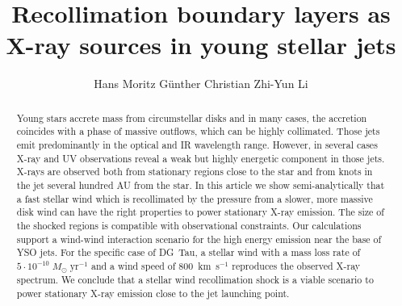 \documentclass[manuscript]{aastex}
\begin{document}

\title{Recollimation boundary layers as X-ray sources in young stellar jets}


\author{Hans Moritz G{\"{u}}nther Christian Zhi-Yun Li}

\begin{abstract}
Young stars accrete mass from circumstellar disks and in many cases, the
accretion coincides with a phase of massive outflows, which can be
highly collimated. Those jets emit predominantly in the optical and IR
wavelength range. However, in several cases X-ray and UV observations
reveal a weak but highly energetic component in those jets. X-rays are
observed both from stationary regions close to the star and from knots
in the jet several hundred AU from the star. In this article we show
semi-analytically that a fast stellar wind which is recollimated by the
pressure from a slower, more massive disk wind can have the right
properties to power stationary X-ray emission. The size of the shocked
regions is compatible with observational constraints. Our calculations
support a wind-wind interaction scenario for the high energy emission
near the base of YSO jets. For the specific case of DG~Tau, a stellar
wind with a mass loss rate of
$5\cdot10^{-10}\;M_{\odot}\;\mathrm{ yr}^{-1}$ and a wind speed of
800~km~s$^{-1}$ reproduces the observed X-ray spectrum. We conclude that
a stellar wind recollimation shock is a viable scenario to power
stationary X-ray emission close to the jet launching point.

\end{abstract}




\end{document}
